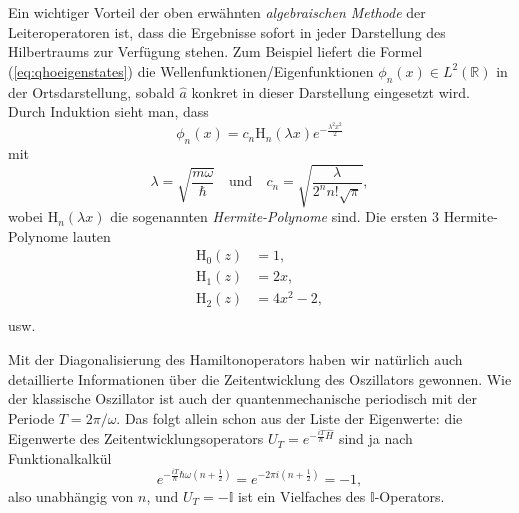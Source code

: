 Ein wichtiger Vorteil der oben erwähnten \emph{algebraischen Methode} der Leiteroperatoren ist,
dass die Ergebnisse sofort in jeder Darstellung des Hilbertraums zur Verfügung stehen. Zum Beispiel liefert die Formel (\ref{eq:qhoeigenstates}) die Wellenfunktionen/Eigenfunktionen $\phi_n(x) ∈ L^2(\mathbb{R})$ in der Ortsdarstellung, sobald $\widehat{a}$ konkret in dieser Darstellung eingesetzt wird. Durch Induktion sieht man, dass 
\begin{equation}
	\phi_n(x) = c_n \mathrm{H}_n(\lambda x)  e^{-\frac{\lambda^2 x^2}{2}}
\end{equation}
mit
\begin{equation}
	\lambda = \sqrt{\frac{m\omega}{\hbar}}\quad \text{und} \quad c_n = \sqrt{\frac{\lambda}{2^n n!\sqrt{\pi}}},
\end{equation}
wobei
$\mathrm{H}_n(\lambda x)$ die sogenannten \emph{Hermite-Polynome} sind. Die ersten $3$ Hermite-Polynome
lauten
\begin{align}
	\mathrm{H}_0(z) &= 1,\\
	\mathrm{H}_1(z) &= 2x,\\
	\mathrm{H}_2(z) &= 4x^2-2,\\
\end{align}
usw.

Mit der Diagonalisierung des Hamiltonoperators haben wir natürlich auch detaillierte Informationen über die Zeitentwicklung des Oszillators gewonnen. Wie der klassische Oszillator ist auch der quantenmechanische periodisch mit der Periode $T = 2\pi/\omega$. Das folgt allein schon aus der Liste der Eigenwerte: die Eigenwerte des Zeitentwicklungsoperators $U_T = e^{-\frac{iT}{\hbar} \widehat{H}}$ sind ja nach Funktionalkalkül
\begin{equation}
	e^{-\frac{iT}{\hbar} \hbar\omega(n+\frac12)} = e^{-2\pi i (n+\frac12)} = -1,
\end{equation}
also unabhängig von $n$, und $U_T = −\mathbb{I}$ ist ein Vielfaches des $\mathbb{I}$-Operators.

